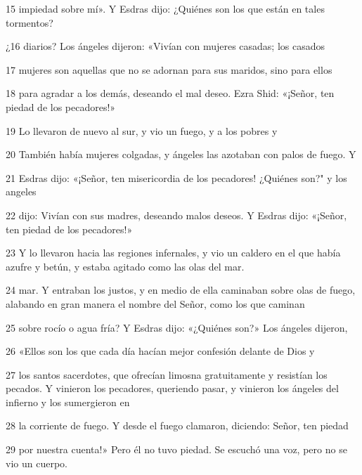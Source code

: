 \par 15 impiedad sobre mí». Y Esdras dijo: ¿Quiénes son los que están en tales tormentos?

\par ¿16 diarios? Los ángeles dijeron: «Vivían con mujeres casadas; los casados

\par 17 mujeres son aquellas que no se adornan para sus maridos, sino para ellos

\par 18 para agradar a los demás, deseando el mal deseo. Ezra Shid: «¡Señor, ten piedad de los pecadores!»

\par 19 Lo llevaron de nuevo al sur, y vio un fuego, y a los pobres y

\par 20 También había mujeres colgadas, y ángeles las azotaban con palos de fuego. Y

\par 21 Esdras dijo: «¡Señor, ten misericordia de los pecadores! ¿Quiénes son?" y los angeles

\par 22 dijo: Vivían con sus madres, deseando malos deseos. Y Esdras dijo: «¡Señor, ten piedad de los pecadores!»

\par 23 Y lo llevaron hacia las regiones infernales, y vio un caldero en el que había azufre y betún, y estaba agitado como las olas del mar.

\par 24 mar. Y entraban los justos, y en medio de ella caminaban sobre olas de fuego, alabando en gran manera el nombre del Señor, como los que caminan

\par 25 sobre rocío o agua fría? Y Esdras dijo: «¿Quiénes son?» Los ángeles dijeron,
\par 26 «Ellos son los que cada día hacían mejor confesión delante de Dios y

\par 27 los santos sacerdotes, que ofrecían limosna gratuitamente y resistían los pecados. Y vinieron los pecadores, queriendo pasar, y vinieron los ángeles del infierno y los sumergieron en

\par 28 la corriente de fuego. Y desde el fuego clamaron, diciendo: Señor, ten piedad

\par 29 por nuestra cuenta!» Pero él no tuvo piedad. Se escuchó una voz, pero no se vio un cuerpo.

